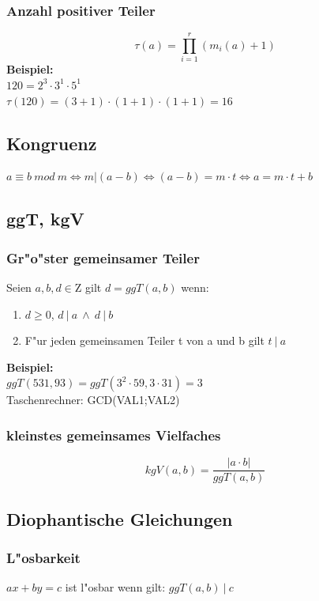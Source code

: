 \documentclass[10pt,a4paper,landscape]{article}
\begin{document}
\begin{multicols*}{3}
		\subsubsection{Anzahl positiver Teiler}
		\[
		\tau(a) =  \prod_{i=1}^{r} (m_i(a)+1)
		\]
		\textbf{Beispiel:}\\
		$120 = 2^3 \cdot 3^1 \cdot 5^1$\\
		$\tau(120) = (3+1)  \cdot (1+1) \cdot (1+1) = 16$
		
		\subsection{Kongruenz}
		\begin{onehalfspacing}
			$a \equiv b~mod~m \Leftrightarrow m | (a - b) \Leftrightarrow (a - b) = m \cdot t \Leftrightarrow a = m \cdot t + b$
		\end{onehalfspacing}
		
		\subsection{ggT, kgV}
		\subsubsection{Gr"o"ster gemeinsamer Teiler}
		Seien $a,b,d \in \mathrm{Z}$ gilt $d = ggT(a,b)$ wenn:
		\begin{enumerate}
			\item $d \geq 0$, $d~|~a~\land~d~|~b$
			\item F"ur jeden gemeinsamen Teiler t von a und b gilt $t~|~a$
		\end{enumerate}
		\textbf{Beispiel:}\\
		$ggT(531, 93) = ggT(3^2 \cdot 59, 3 \cdot 31) = 3$
		\\Taschenrechner: GCD(VAL1;VAL2)
		
		\subsubsection{kleinstes gemeinsames Vielfaches}
		\[
		kgV(a, b) = \frac{|a \cdot b|}{ggT(a,b)}
		\]
		
		\subsection{Diophantische Gleichungen}
		\subsubsection{L"osbarkeit}
		$ax + by = c$ ist l"osbar wenn gilt: $ggT(a,b)~|~c$
		

\end{multicols*}
\end{document}
